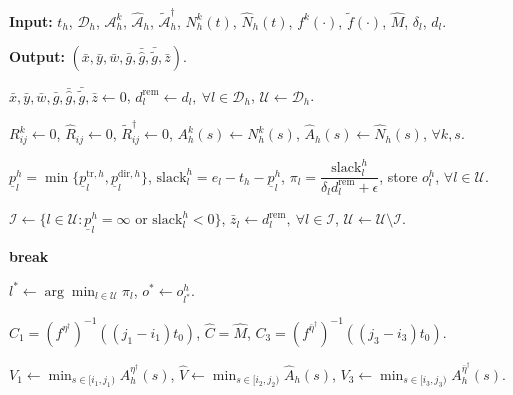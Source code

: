 \documentclass[10pt, reqno]{amsart}
\begin{document}
\begin{algorithm}[!htbp]
\caption{Dynamic BHH-aware priority construction heuristic}
\label{alg:dynamic_bhh_priority}
\begin{algorithmic}[1]

\Statex \textbf{Input:} $t_h$, $\mathcal D_h$, $\mathcal A_h^k$, $\widehat{\mathcal A}_h$, 
$\widetilde{\mathcal A}_h^\dagger$, $N_h^k(t)$, $\widehat N_h(t)$,
$f^k(\cdot)$, $\widetilde f(\cdot)$, $\widehat M$, $\delta_l$, $d_l$.

\Statex \textbf{Output:} 
$(\bar x,\bar y,\bar w,\bar g,\bar{\widehat g},\bar{\widetilde g},\bar z)$.

\State 
$\bar x,\bar y,\bar w,\bar g,\bar{\widehat g},\bar{\widetilde g},\bar z\leftarrow 0$,
$d_l^{\mathrm{rem}}\leftarrow d_l,\ \forall l\in\mathcal D_h$,
$\mathcal U\leftarrow\mathcal D_h$.

\State 
$R_{ij}^k\leftarrow 0$,
$\widehat R_{ij}\leftarrow 0$,
$\widetilde R_{ij}^{\dagger}\leftarrow 0$,
$A_h^k(s)\leftarrow N_h^k(s)$,
$\widehat A_h(s)\leftarrow \widehat N_h(s)$,
$\forall k,s$.


    \State 
    $\underline p_l^h
    =
    \min\{\underline p_l^{\mathrm{tr},h},\underline p_l^{\mathrm{dir},h}\}$,
    $\mathrm{slack}_l^h=e_l-t_h-\underline p_l^h$,
    $\pi_l=
    \dfrac{\mathrm{slack}_l^h}{\delta_l d_l^{\mathrm{rem}}+\epsilon}$,
    store $o_l^h$,
    $\forall l\in\mathcal U$.

    \State 
    $\mathcal I
    \leftarrow
    \{l\in\mathcal U:
    \underline p_l^h=\infty
    \text{ or }
    \mathrm{slack}_l^h<0\}$,
    $\bar z_l\leftarrow d_l^{\mathrm{rem}},\ \forall l\in\mathcal I$,
    $\mathcal U\leftarrow\mathcal U\setminus\mathcal I$.

     \textbf{break}
    \EndIf

    \State 
    $l^*\leftarrow \arg\min_{l\in\mathcal U}\pi_l$,
    $o^*\leftarrow o_{l^*}^h$.


        \State 
        $C_1=(f^{\eta^\dagger})^{-1}((j_1-i_1)t_0)$,
        $\widehat C=\widehat M$,
        $C_3=(f^{\bar\eta^\dagger})^{-1}((j_3-i_3)t_0)$.

        \State 
        $V_1\leftarrow \min_{s\in[i_1,j_1)}A_h^{\eta^\dagger}(s)$,
        $\widehat V\leftarrow \min_{s\in[i_2,j_2)}\widehat A_h(s)$,
        $V_3\leftarrow \min_{s\in[i_3,j_3)}A_h^{\bar\eta^\dagger}(s)$.


\end{algorithmic}
\end{algorithm}
\end{document}
